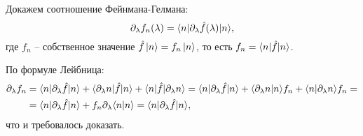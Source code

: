 
Докажем соотношение Фейнмана-Гелмана:
\begin{equation*}
    \partial_\lambda f_n (\lambda) = \bk{n}[\partial_\lambda \hat{f}(\lambda)]{n},
\end{equation*}
где $f_n$ -- собственное значение $\hat{f} \left| n \right\rangle = f_n \left| n \right\rangle$, то есть $f_n = \bk{n}[\hat{f}]{n}$. 

По формуле Лейбница:
\begin{align*}
    \partial_\lambda f_n 
    &= 
    \bk{n}[\partial_\lambda \hat{f}]{n} + 
    \bk{\partial_\lambda n}[\hat{f}]{n} + \bk{n}[\hat{f}]{\partial_\lambda n} 
    =
    \bk{n}[\partial_\lambda \hat{f}]{n} + \bk{\partial_\lambda n}{n} f_n + 
    \bk{n}{\partial_\lambda n} f_n 
    = \\ &=
    \bk{n}[\partial_\lambda \hat{f}]{n} + f_n \partial_\lambda \bk{n}{n} 
    = 
    \bk{n}[\partial_\lambda \hat{f}]{n},
\end{align*}
что и требовалось доказать.